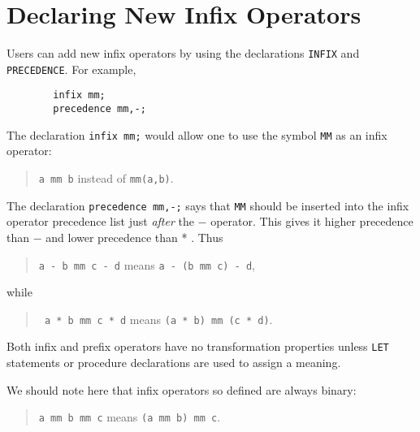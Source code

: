 \section{Declaring New Infix Operators}
\hypertarget{command:INFIX}{}
\hypertarget{command:PRECEDENCE}{}

Users can add new infix operators by using the declarations
\texttt{INFIX} and \texttt{PRECEDENCE}.
For example,
\begin{verbatim}
        infix mm;
        precedence mm,-;
\end{verbatim}
The declaration \texttt{infix mm;} would allow one to use the symbol
\texttt{MM} as an infix operator:
\begin{quote}
\hspace{0.2in} \texttt{a mm b} \hspace{0.3in} instead of \hspace{0.3in}
\texttt{mm(a,b)}.
\end{quote}

The declaration \texttt{precedence mm,-;} says that \texttt{MM} should be
inserted into the infix operator precedence list just {\em after\/}
the $-$ operator.  This gives it higher precedence than $-$ and lower
precedence than * .  Thus

\begin{quote}
\hspace{0.2in}\texttt{a - b mm c - d}\hspace{.3in} means \hspace{.3in}
\texttt{a - (b mm c) - d},
\end{quote}
while
\begin{quote}
\hspace{0.2in}\texttt{  a * b mm c * d}\hspace{.3in} means \hspace{.3in}
\texttt{(a * b) mm (c * d)}.
\end{quote}

Both infix and prefix operators have no transformation
properties unless \texttt{LET} statements or procedure
declarations are used to assign a meaning.

We should note here that infix operators so defined are always binary:
\begin{quote}
\hspace{0.2in}\texttt{a mm b mm c}\hspace{.3in} means \hspace{.3in}
\texttt{(a mm b) mm c}.
\end{quote}

